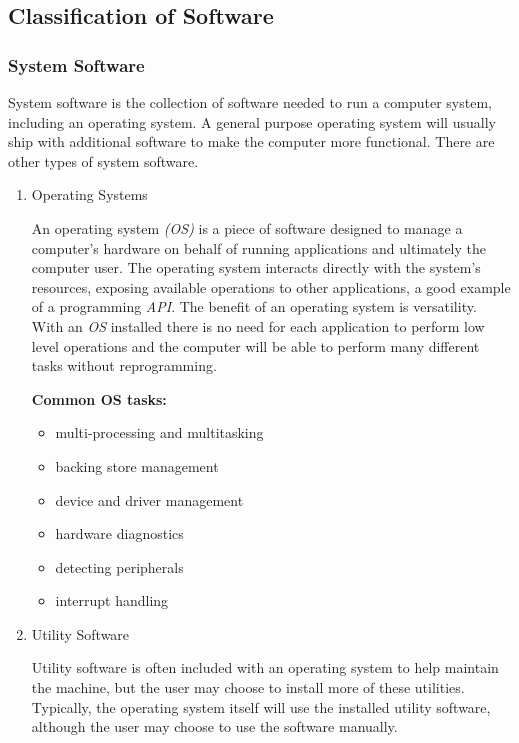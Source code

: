 \documentclass[9pt]{article}
\begin{document}
\subsection{Classification of Software}
\label{sec:org52a4833}
\subsubsection{System Software}
\label{sec:org70841a3}

System software is the collection of software needed to run a computer system, including an operating system. A general purpose operating system will usually ship with additional software to make the computer more functional. There are other types of system software.

\begin{enumerate}
\item Operating Systems
\label{sec:orgb1a9f12}

An operating system \emph{(OS)} is a piece of software designed to manage a computer's hardware on behalf of running applications and ultimately the computer user. The operating system interacts directly with the system's resources, exposing available operations to other applications, a good example of a programming \emph{API}. The benefit of an operating system is versatility. With an \emph{OS} installed there is no need for each application to perform low level operations and the computer will be able to perform many different tasks without reprogramming.

\textbf{Common OS tasks:}

\begin{itemize}
\item multi-processing and multitasking
\item backing store management
\item device and driver management
\item hardware diagnostics
\item detecting peripherals
\item interrupt handling
\end{itemize}

\item Utility Software
\label{sec:orgee78507}

Utility software is often included with an operating system to help maintain the machine, but the user may choose to install more of these utilities. Typically, the operating system itself will use the installed utility software, although the user may choose to use the software manually.


\end{enumerate}
\end{document}
